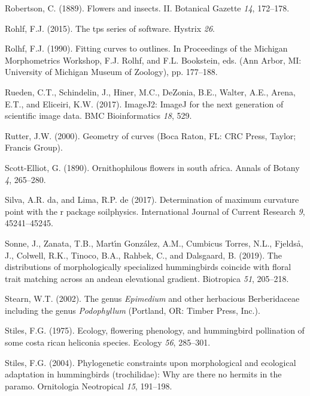 \documentclass[]{article}
\begin{document}
\leavevmode\hypertarget{ref-robertson_1889}{}%
Robertson, C. (1889). Flowers and insects. II. Botanical Gazette
\emph{14}, 172--178.

\leavevmode\hypertarget{ref-rohlf_2015}{}%
Rohlf, F.J. (2015). The tps series of software. Hystrix \emph{26}.

\leavevmode\hypertarget{ref-rohlf_1990}{}%
Rolhf, F.J. (1990). Fitting curves to outlines. In Proceedings of the
Michigan Morphometrics Workshop, F.J. Rolhf, and F.L. Bookstein, eds.
(Ann Arbor, MI: University of Michigan Museum of Zoology), pp. 177--188.

\leavevmode\hypertarget{ref-rueden_2017}{}%
Rueden, C.T., Schindelin, J., Hiner, M.C., DeZonia, B.E., Walter, A.E.,
Arena, E.T., and Eliceiri, K.W. (2017). ImageJ2: ImageJ for the next
generation of scientific image data. BMC Bioinformatics \emph{18}, 529.

\leavevmode\hypertarget{ref-rutter_2000}{}%
Rutter, J.W. (2000). Geometry of curves (Boca Raton, FL: CRC Press,
Taylor; Francis Group).

\leavevmode\hypertarget{ref-scott-elliot_1890}{}%
Scott-Elliot, G. (1890). Ornithophilous flowers in south africa. Annals
of Botany \emph{4}, 265--280.

\leavevmode\hypertarget{ref-silva_2017}{}%
Silva, A.R. da, and Lima, R.P. de (2017). Determination of maximum
curvature point with the r package soilphysics. International Journal of
Current Research \emph{9}, 45241--45245.

\leavevmode\hypertarget{ref-sonne_2019}{}%
Sonne, J., Zanata, T.B., Martı́n González, A.M., Cumbicus Torres, N.L.,
Fjeldså, J., Colwell, R.K., Tinoco, B.A., Rahbek, C., and Dalsgaard, B.
(2019). The distributions of morphologically specialized hummingbirds
coincide with floral trait matching across an andean elevational
gradient. Biotropica \emph{51}, 205--218.

\leavevmode\hypertarget{ref-stearn_2002}{}%
Stearn, W.T. (2002). The genus \emph{Epimedium} and other herbacious
Berberidaceae including the genus \emph{Podophyllum} (Portland, OR:
Timber Press, Inc.).

\leavevmode\hypertarget{ref-stiles_1975}{}%
Stiles, F.G. (1975). Ecology, flowering phenology, and hummingbird
pollination of some costa rican heliconia species. Ecology \emph{56},
285--301.

\leavevmode\hypertarget{ref-stiles_2004}{}%
Stiles, F.G. (2004). Phylogenetic constraints upon morphological and
ecological adaptation in hummingbirds (trochilidae): Why are there no
hermits in the paramo. Ornitologia Neotropical \emph{15}, 191--198.
\end{document}

